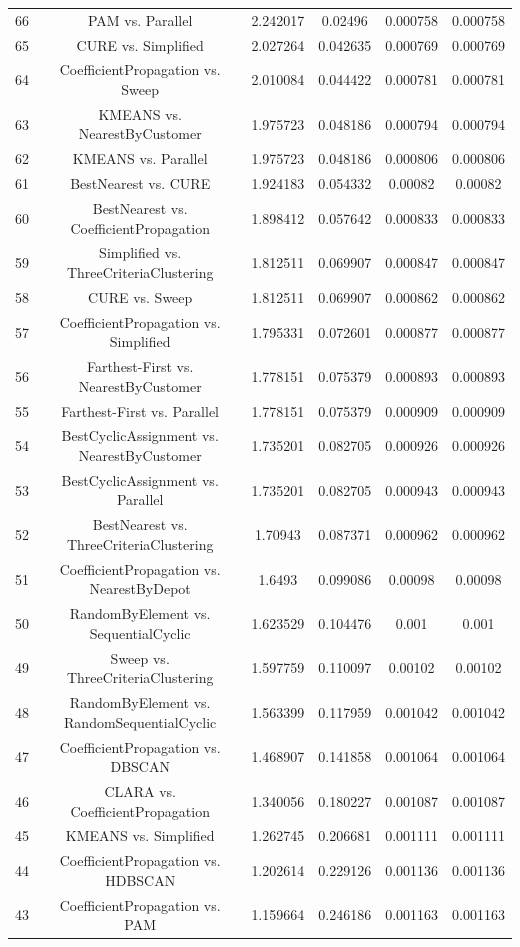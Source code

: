 \documentclass[a4paper,10pt]{article}
\begin{document}
\begin{landscape}
\begin{table}[!htp]
\begin{tabular}{cccccc}
66&PAM vs. Parallel&2.242017&0.02496&0.000758&0.000758\\
65&CURE vs. Simplified&2.027264&0.042635&0.000769&0.000769\\
64&CoefficientPropagation vs. Sweep&2.010084&0.044422&0.000781&0.000781\\
63&KMEANS vs. NearestByCustomer&1.975723&0.048186&0.000794&0.000794\\
62&KMEANS vs. Parallel&1.975723&0.048186&0.000806&0.000806\\
61&BestNearest vs. CURE&1.924183&0.054332&0.00082&0.00082\\
60&BestNearest vs. CoefficientPropagation&1.898412&0.057642&0.000833&0.000833\\
59&Simplified vs. ThreeCriteriaClustering&1.812511&0.069907&0.000847&0.000847\\
58&CURE vs. Sweep&1.812511&0.069907&0.000862&0.000862\\
57&CoefficientPropagation vs. Simplified&1.795331&0.072601&0.000877&0.000877\\
56&Farthest-First vs. NearestByCustomer&1.778151&0.075379&0.000893&0.000893\\
55&Farthest-First vs. Parallel&1.778151&0.075379&0.000909&0.000909\\
54&BestCyclicAssignment vs. NearestByCustomer&1.735201&0.082705&0.000926&0.000926\\
53&BestCyclicAssignment vs. Parallel&1.735201&0.082705&0.000943&0.000943\\
52&BestNearest vs. ThreeCriteriaClustering&1.70943&0.087371&0.000962&0.000962\\
51&CoefficientPropagation vs. NearestByDepot&1.6493&0.099086&0.00098&0.00098\\
50&RandomByElement vs. SequentialCyclic&1.623529&0.104476&0.001&0.001\\
49&Sweep vs. ThreeCriteriaClustering&1.597759&0.110097&0.00102&0.00102\\
48&RandomByElement vs. RandomSequentialCyclic&1.563399&0.117959&0.001042&0.001042\\
47&CoefficientPropagation vs. DBSCAN&1.468907&0.141858&0.001064&0.001064\\
46&CLARA vs. CoefficientPropagation&1.340056&0.180227&0.001087&0.001087\\
45&KMEANS vs. Simplified&1.262745&0.206681&0.001111&0.001111\\
44&CoefficientPropagation vs. HDBSCAN&1.202614&0.229126&0.001136&0.001136\\
43&CoefficientPropagation vs. PAM&1.159664&0.246186&0.001163&0.001163\\

\end{tabular}
\end{table}
\end{landscape}
\end{document}
